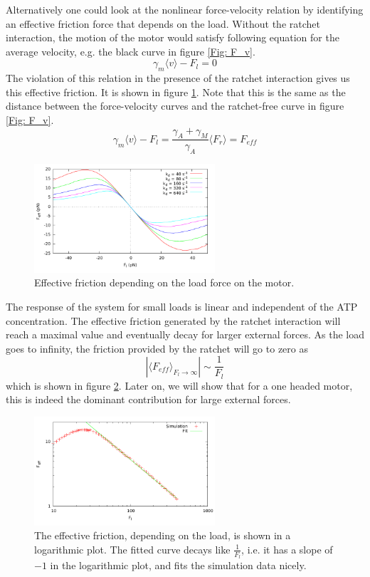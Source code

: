 \documentclass[aps,pre,onecolumn,showpacs,showkeys,a4paper]{revtex4}
\begin{document}
Alternatively one could look at the nonlinear force-velocity relation by identifying an effective friction force that depends on the load. 
Without the ratchet interaction, the motion of the motor would satisfy following equation for the average velocity, e.g. the black curve in figure \ref{Fig: F_v}.
\begin{equation*}
\gamma_{m}\langle v\rangle - F_{l} = 0
\end{equation*}
The violation of this relation in the presence of the ratchet interaction gives us this effective friction. 
It is shown in figure \ref{Fig: effective_friction}. 
Note that this is the same as the distance between the force-velocity curves and the ratchet-free curve in figure \ref{Fig: F_v}.
\begin{equation*}
\gamma_{m}\langle v\rangle - F_{l} = \frac{\gamma_A + \gamma_M}{\gamma_A} \langle F_r \rangle = F_{eff}
\end{equation*}
\begin{figure}[h]
\centering
\includegraphics[width=0.6\textwidth,height=!]{effective_friction}
\caption{Effective friction depending on the load force on the motor.}
\label{Fig: effective_friction}
\end{figure}
The response of the system for small loads is linear and independent of the ATP concentration. 
The effective friction generated by the ratchet interaction will reach a maximal value and eventually decay for larger external forces. 
As the load goes to infinity, the friction provided by the ratchet will go to zero as 
\begin{equation*}
|\langle F_{eff}\rangle_{F_l\rightarrow\infty}| \sim \frac{1}{F_l}
\end{equation*} 
which is shown in figure \ref{Fig: eff_frict_decay}. 
Later on, we will show that for a one headed motor, this is indeed the dominant contribution for large external forces.  
\begin{figure}[h]
\centering
\includegraphics[width=0.6\textwidth,height=!]{eff_frict_decay}
\caption{The effective friction, depending on the load, is shown in a logarithmic plot. 
The fitted curve decays like $\frac{1}{F_l}$, i.e. it has a slope of $-1$ in the logarithmic plot, and fits the simulation data nicely.}
\label{Fig: eff_frict_decay}
\end{figure}
\end{document}
